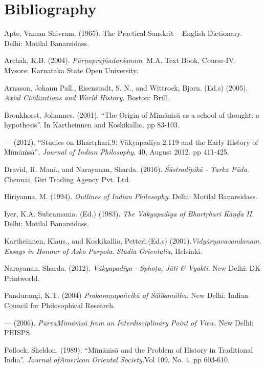 \section*{Bibliography}

\begin{thebibliography}{99}
\itemsep=1pt
 Apte, Vaman Shivram. (1965). The Practical Sanskrit – English Dictionary. Delhi: Motilal Banarsidass.

  Archak, K.B. (2004). \textit{Pūrṇaprajñadarśanam}. M.A. Text Book, Course-IV. Mysore: Karnataka State Open University.

  Arnason, Johann Pall., Eisenstadt, S. N., and Wittrock, Bjorn. (Ed.s) (2005). \textit{Axial Civilizations and World History.} Boston: Brill.

  Bronkhorst, Johannes. (2001). “The Origin of Mīmāṁsā as a school of thought: a hypothesis”. In Kartheinnen and Koskikallio. pp 83-103.

  — (2012). “Studies on Bhartṛhari,9: Vākyapadīya 2.119 and the Early History of Mīmāṁsā”, \textit{Journal of Indian Philosophy}, 40, August 2012. pp 411-425.

  Dravid, R. Mani., and Narayanan, Sharda. (2016). \textit{Śāstradīpikā - Tarka Pāda}. Chennai. Giri Trading Agency Pvt. Ltd. 

  Hiriyanna, M. (1994). \textit{Outlines of Indian Philosophy}. Delhi: Motilal Banarsidass. 

  Iyer, K.A. Subramania. (Ed.) (1983). \textit{The Vākyapadīya of Bhartṛhari Kāṇḍa II.} Delhi: Motilal Banarsidass.

  Kartheinnen, Klaus., and Koskikallio, Petteri.(Ed.s) (2001).\textit{Vidyārņavavandanam. Essays in Honour of Asko Parpola}. \textit{Studia Orientalia}, Helsinki.

  Narayanan, Sharda. (2012). \textit{Vākyapadīya - Sphoṭa, Jāti \& Vyakti}. New Delhi: DK Printworld. 

  Pandurangi, K.T. (2004) \textit{Prakaraņapañcikā of Śālikanātha}. New Delhi: Indian Council for Philosophical Research.

  — (2006). \textit{PūrvaMīmāṁsā from an Interdisciplinary Point of View.} New Delhi: PHISPS. 

  Pollock, Sheldon. (1989). “Mīmāṁsā and the Problem of History in Traditional India”. \textit{Journal ofAmerican Oriental Society.}Vol 109, No. 4. pp 603-610.


\end{thebibliography}
